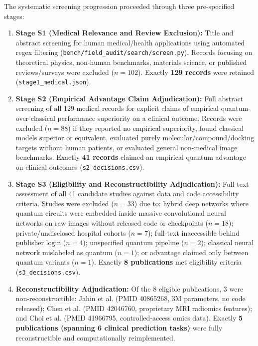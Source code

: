 \documentclass[10pt,a4paper]{article}
\begin{document}
The systematic screening progression proceeded through three pre-specified stages:
\begin{enumerate}
  \setlength{\itemsep}{2pt}
  \item \textbf{Stage S1 (Medical Relevance and Review Exclusion):} Title and abstract screening for human medical/health applications using automated regex filtering (\texttt{bench/field\_audit/search/screen.py}). Records focusing on theoretical physics, non-human benchmarks, materials science, or published reviews/surveys were excluded ($n = 102$). Exactly \textbf{129 records} were retained (\texttt{stage1\_medical.json}).
  \item \textbf{Stage S2 (Empirical Advantage Claim Adjudication):} Full abstract screening of all 129 medical records for explicit claims of empirical quantum-over-classical performance superiority on a clinical outcome. Records were excluded ($n = 88$) if they reported no empirical superiority, found classical models superior or equivalent, evaluated purely molecular/compound/docking targets without human patients, or evaluated general non-medical image benchmarks. Exactly \textbf{41 records} claimed an empirical quantum advantage on clinical outcomes (\texttt{s2\_decisions.csv}).
  \item \textbf{Stage S3 (Eligibility and Reconstructibility Adjudication):} Full-text assessment of all 41 candidate studies against data and code accessibility criteria. Studies were excluded ($n = 33$) due to: hybrid deep networks where quantum circuits were embedded inside massive convolutional neural networks on raw images without released code or checkpoints ($n = 18$); private/undisclosed hospital cohorts ($n = 7$); full-text inaccessible behind publisher login ($n = 4$); unspecified quantum pipeline ($n = 2$); classical neural network mislabeled as quantum ($n = 1$); or advantage claimed only between quantum variants ($n = 1$). Exactly \textbf{8 publications} met eligibility criteria (\texttt{s3\_decisions.csv}).
  \item \textbf{Reconstructibility Adjudication:} Of the 8 eligible publications, 3 were non-reconstructible: Jahin et al. (PMID 40865268, 3M parameters, no code released); Chen et al. (PMID 42046760, proprietary MRI radiomics features); and Choi et al. (PMID 41966795, controlled-access omics data). Exactly \textbf{5 publications (spanning 6 clinical prediction tasks)} were fully reconstructible and computationally reimplemented.
\end{enumerate}
\end{document}
